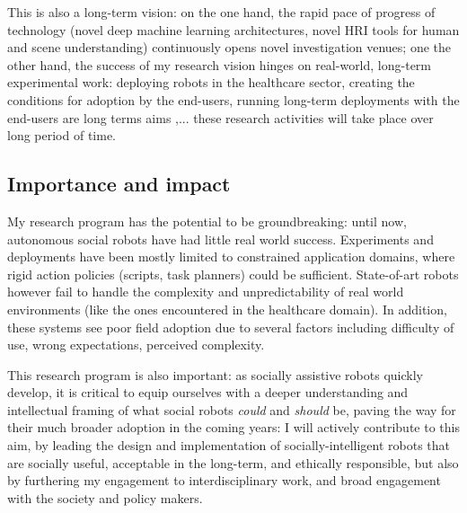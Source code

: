 This is also a long-term vision: on the one hand, the rapid pace of progress
of technology (novel deep machine learning architectures, novel HRI tools for
human and scene understanding) continuously opens novel investigation
venues; one the other hand, the success of my research vision hinges on
real-world, long-term experimental work: deploying robots in the healthcare
sector, creating the conditions for adoption by the end-users, running
long-term deployments with the end-users are long terms aims
,... these research activities will take
place over long period of time.

\subsection{Importance and impact}

My research program has the potential to be groundbreaking: until now,
autonomous social robots have had little real world success. Experiments and
deployments have been mostly limited to constrained application domains, where
rigid action policies (scripts, task planners) could be sufficient. State-of-art
robots however fail to handle the complexity and unpredictability of real world
environments (like the ones encountered in the healthcare domain). In addition,
these systems see poor field adoption due to several factors including
difficulty of use, wrong expectations, perceived complexity.

This research program is also important: as socially assistive robots quickly
develop, it is critical to equip ourselves with a deeper understanding and
intellectual framing of what social robots \emph{could} and \emph{should} be,
paving the way for their much broader adoption in the coming years: I will
actively contribute to this aim, by leading the design and implementation of
socially-intelligent robots that are socially useful, acceptable in the
long-term, and ethically responsible, but also by furthering my engagement to
interdisciplinary work, and broad engagement with the society and policy makers.












